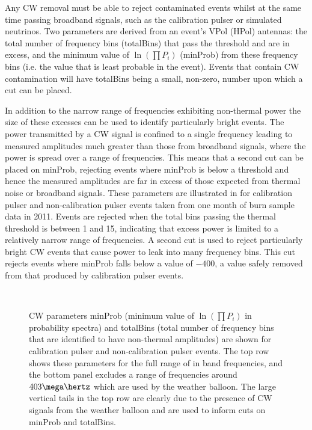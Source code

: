 Any CW removal must be able to reject contaminated events whilst at the same time passing broadband signals, such as the calibration pulser or simulated neutrinos. Two parameters are derived from an event's VPol (HPol) antennas: the total number of frequency bins (totalBins) that pass the threshold and are in excess, and the minimum value of $\ln(\prod P_{i})$ (minProb) from these frequency bins (i.e. the value that is least probable in the event). Events that contain CW contamination will have totalBins being a small, non-zero, number upon which a cut can be placed. 

In addition to the narrow range of frequencies exhibiting non-thermal power the size of these excesses can be used to identify particularly bright events. The power transmitted by a CW signal is confined to a single frequency leading to measured amplitudes much greater than those from broadband signals, where the power is spread over a range of frequencies. This means that a second cut can be placed on minProb, rejecting events where minProb is below a threshold and hence the measured amplitudes are far in excess of those expected from thermal noise or broadband signals. These parameters are illustrated in  for calibration pulser and non-calibration pulser events taken from one month of burn sample data in 2011. Events are rejected when the total bins passing the thermal threshold is between 1 and 15, indicating that excess power is limited to a relatively narrow range of frequencies. A second cut is used to reject particularly bright CW events that cause power to leak into many frequency bins. This cut rejects events where minProb falls below a value of $-400$, a value safely removed from that produced by calibration pulser events. 


\begin{figure}[htpb]
  \hfill
  \\
  \hfill
  \caption{CW parameters minProb (minimum value of $\ln(\prod P_{i})$ in probability spectra) and totalBins (total number of frequency bins that are identified to have non-thermal amplitudes) are shown for calibration pulser and non-calibration pulser events. The top row shows these parameters for the full range of in band frequencies, and the bottom panel excludes a range of frequencies around $403 \mega \hertz$ which are used by the weather balloon. The large vertical tails in the top row are clearly due to the presence of CW signals from the weather balloon and are used to inform cuts on minProb and totalBins.}
  \label{fig:analysis:CWRemoval:Filtering:CW-MinProb-TotalBins}
\end{figure}


